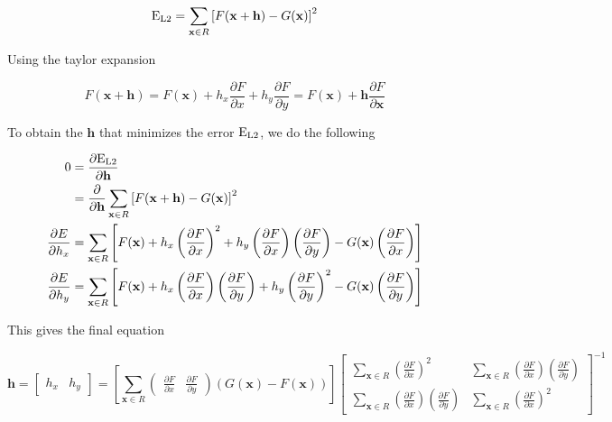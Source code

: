 \begin{equation*}
    \textup{E}_{\textup{L2}} = \sum_{\textbf{x} \in R} \left[ F(\mathbf{x+h}) - G(\mathbf{x}) \right]^2
\end{equation*}

Using the taylor expansion

\begin{equation*}
    F(\mathbf{x+h}) = F(\mathbf{x}) + h_x \frac{\partial F}{\partial x} + h_y \frac{\partial F}{\partial y} = F(\mathbf{x}) + \mathbf{h} \frac{\partial F}{\partial \mathbf{x}}
\end{equation*}

To obtain the $\mathbf{h}$ that minimizes the error $\textup{E}_{\textup{L2}}$, we do the following

\begin{align*}
    0 &= \frac{\partial \textup{E}_{\textup{L2}}}{\partial \mathbf{h}} \\
      &= \frac{\partial }{\partial \mathbf{h}} \sum_{\textbf{x} \in R} \left[ F(\mathbf{x+h}) - G(\mathbf{x}) \right]^2 \\
    \frac{\partial E}{\partial h_x} &= \sum_{\textbf{x} \in R} \left [ F(\mathbf{x}) + h_x \left ( \frac{\partial F}{\partial x} \right )^2 + h_y \left ( \frac{\partial F}{\partial x} \right ) \left ( \frac{\partial F}{\partial y} \right ) - G(\mathbf{x}) \left ( \frac{\partial F}{\partial x} \right ) \right ] \\
    \frac{\partial E}{\partial h_y} &= \sum_{\textbf{x} \in R} \left [ F(\mathbf{x}) + h_x \left ( \frac{\partial F}{\partial x} \right ) \left ( \frac{\partial F}{\partial y} \right ) + h_y \left ( \frac{\partial F}{\partial y} \right )^2 - G(\mathbf{x}) \left ( \frac{\partial F}{\partial y} \right ) \right ]
\end{align*}

This gives the final equation

\begin{equation}
    \mathbf{h} = \begin{bmatrix} h_x & h_y \end{bmatrix} = \left [ \sum_{\mathbf{x} \in R} \begin{pmatrix}
        \frac{\partial F}{\partial x} & \frac{\partial F}{\partial y}
        \end{pmatrix} \left( G(\mathbf{x}) - F(\mathbf{x}) \right ) \right ] \begin{bmatrix}
        \sum_{\mathbf{x} \in R} \left ( \frac{\partial F}{\partial x} \right )^2 &
        \sum_{\mathbf{x} \in R} \left ( \frac{\partial F}{\partial x} \right ) \left ( \frac{\partial F}{\partial y} \right ) \\
        \sum_{\mathbf{x} \in R} \left ( \frac{\partial F}{\partial x} \right ) \left ( \frac{\partial F}{\partial y} \right ) &
        \sum_{\mathbf{x} \in R} \left ( \frac{\partial F}{\partial x} \right )^2
        \end{bmatrix}^{-1}
\end{equation}

